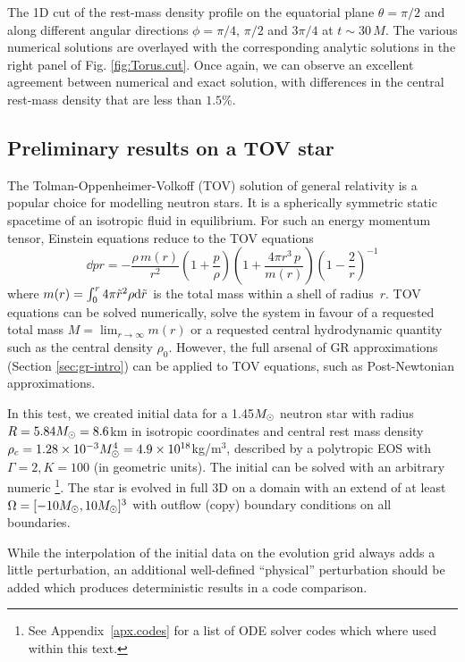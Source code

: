 The 1D cut of the rest-mass density profile on the equatorial plane
$\theta=\pi/2$ and along different angular directions $\phi=\pi/4$,
$\pi/2$ and $3 \pi/4$ at $t\sim 30\,M$.  The various numerical solutions
are overlayed with the corresponding analytic solutions in the right
panel of Fig. \ref{fig:Torus.cut}. Once again, we can observe an
excellent agreement between numerical and exact solution, with
differences in the central rest-mass density that are less than $1.5\%$.

\subsection{Preliminary results on a TOV star}\label{sec:tov}
The Tolman-Oppenheimer-Volkoff (TOV) solution of general relativity is a popular choice
for modelling neutron stars. It is a spherically symmetric static spacetime of
an isotropic fluid in equilibrium. For such an energy momentum tensor, Einstein
equations reduce to the TOV equations \cite{Tolman39,Oppenheimer39b}
\begin{equation}
\dd pr=-\frac{\rho\, m(r)}{r^2}\left(1+\frac{p}{\rho}\right)\left(1+\frac{4\pi r^3 \,p}{m(r)}\right)\left(1-\frac{2}{r}\right)^{-1}
\end{equation}
where $m(r)=\int_0^r 4\pi\tilde r^2 \rho \mathrm{d} \tilde r$ is the total mass within a shell of
radius~$r$. TOV equations can be solved numerically, \ie solve the system in favour
of a requested total mass $M=\lim_{r\to\infty}m(r)$ or a requested central hydrodynamic
quantity such as the central density $\rho_0$. However, the full arsenal of GR
approximations (Section \ref{sec:gr-intro}) can be applied to TOV equations, such as
Post-Newtonian approximations.

In this test, we created initial data for a 1.45$M_{\odot}$ neutron star with
radius $R=5.84 M_{\odot} = 8.6$km in isotropic coordinates and central rest mass density
$\rho_c = 1.28\times 10^{-3} M_{\odot}^{4} = 4.9 \times 10^{18}$kg/m$^3$,
described by a polytropic EOS with $\Gamma=2, K=100$ (in geometric units). The initial
can be solved with an arbitrary numeric 
\footnote{
	See Appendix~\ref{apx.codes} for a list of ODE solver codes which
	where used within this text.
}. The star is evolved in full 3D on a domain with an extend of at least 
$\Omega=[-10M_{\odot},10M_{\odot}]^3$ with outflow (copy) boundary
conditions on all boundaries.

While the interpolation of the initial data on the evolution grid always adds a little
perturbation, an additional well-defined ``physical'' perturbation should be added
which produces deterministic results in a code comparison.

